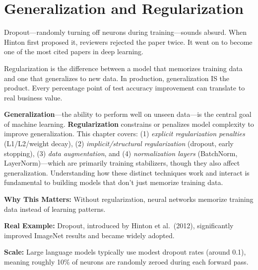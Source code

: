 \documentclass[../../main.tex]{subfiles}
\begin{document}
\chapter{Generalization and Regularization}
\label{ch:regularization}

Dropout---randomly turning off neurons during training---sounds absurd. When Hinton first proposed it, reviewers rejected the paper twice. It went on to become one of the most cited papers in deep learning.

\begin{whycare}
Regularization is the difference between a model that memorizes training data and one that generalizes to new data. In production, generalization IS the product. Every percentage point of test accuracy improvement can translate to real business value.
\end{whycare}

\begin{keyconcept}
\textbf{Generalization}---the ability to perform well on unseen data---is the central goal of machine learning. \textbf{Regularization} constrains or penalizes model complexity to improve generalization. This chapter covers: (1) \textit{explicit regularization penalties} (L1/L2/weight decay), (2) \textit{implicit/structural regularization} (dropout, early stopping), (3) \textit{data augmentation}, and (4) \textit{normalization layers} (BatchNorm, LayerNorm)---which are primarily training stabilizers, though they also affect generalization. Understanding how these distinct techniques work and interact is fundamental to building models that don't just memorize training data.
\end{keyconcept}

\begin{realworld}
\textbf{Why This Matters:} Without regularization, neural networks memorize training data instead of learning patterns.

\textbf{Real Example:} Dropout, introduced by Hinton et al.\ (2012), significantly improved ImageNet results and became widely adopted.

\textbf{Scale:} Large language models typically use modest dropout rates (around 0.1), meaning roughly 10\% of neurons are randomly zeroed during each forward pass.
\end{realworld}
\end{document}
